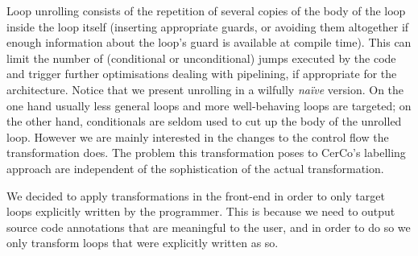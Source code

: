 \documentclass[submission,copyright,creativecommons]{eptcs}
\theoremstyle{definition}
\begin{document}
Loop unrolling consists of the repetition of several copies of the body of the loop inside the loop itself (inserting appropriate guards, or avoiding them altogether if enough information about the loop's guard is available at compile time).
This can limit the number of (conditional or unconditional) jumps executed by the code and trigger further optimisations dealing with pipelining, if appropriate for the architecture.
Notice that we present unrolling in a wilfully \emph{na\"{i}ve} version.
On the one hand usually
less general loops and more well-behaving loops are targeted; on the other hand,
conditionals are seldom used to cut up the body of the unrolled loop.
However we are mainly interested in the changes to the control flow the transformation
does. The problem this transformation poses to CerCo's labelling approach are
independent of the sophistication of the actual transformation.

We decided to apply transformations in the front-end in order to only target loops explicitly
written by the programmer. This is because we need to output source code annotations that are
meaningful to the user, and in order to do so we only transform loops that were explicitly
written as so.
\end{document}
